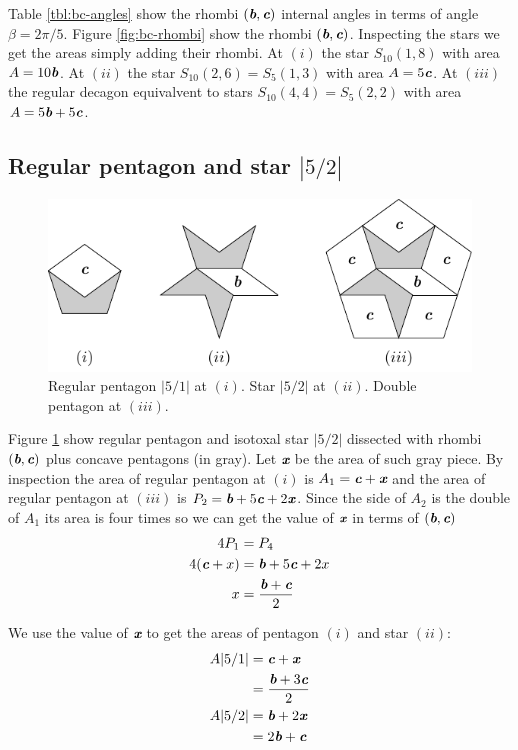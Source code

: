 \documentclass[11pt]{article}
\def\mathbi#1{\textbf{\em #1}}
\begin{document}
Table \ref {tbl:bc-angles} show the rhombi $(\mathbi{b},\mathbi{c})$ internal angles in terms of angle $\beta = 2\pi/5$.
Figure \ref{fig:bc-rhombi} show the rhombi $(\mathbi{b},\mathbi{c})$. 
Inspecting the stars we get the areas simply adding their rhombi.
At $(i)$ the star $S_{10}(1,8)$ with area $A = 10\mathbi{b}$.
At $(ii)$ the star $S_{10}(2,6) = S_5(1,3)$ with area $A = 5\mathbi{c}$.
At $(iii)$ the regular decagon equivalvent to stars $S_{10}(4,4) = S_5(2,2)$ with area $A = 5\mathbi{b} + 5\mathbi{c}$. 

\subsection{Regular pentagon and star $|5/2|$}

\begin{figure}[H]
\centering
\includegraphics[scale=1.1]{bc/penta}
\caption{Regular pentagon $|5/1|$ at $(i)$. Star $|5/2|$ at $(ii)$. Double pentagon at $(iii)$.}
\label{fig:bc-penta}
\end{figure}

Figure \ref{fig:bc-penta} show regular pentagon and isotoxal star $|5/2|$ dissected with rhombi $(\mathbi{b},\mathbi{c})$ plus concave pentagons (in gray). Let $\mathbi{x}$ be the area of such gray piece. By inspection the area of regular pentagon at $(i)$ is $A_1 = \mathbi{c} + \mathbi{x}$ and the area of regular pentagon at $(iii)$ is $P_2 = \mathbi{b} + 5\mathbi{c} + 2\mathbi{x}$. Since the side of $A_2$ is the double of $A_1$ its area is four times so we can get the value of $\mathbi{x}$ in terms of $(\mathbi{b},\mathbi{c})$
\begin{align}
4P_1 &= P_4 \nonumber\\
4(\mathbi{c} + x) &= \mathbi{b} + 5\mathbi{c} + 2x\nonumber\\
x &= \frac{\mathbi{b} + \mathbi{c}}2
\end{align}

We use the value of $\mathbi{x}$ to get the areas of pentagon $(i)$ and star $(ii)$:
\begin{align}
A|5/1| &= \mathbi{c} + \mathbi{x} \nonumber\\
 &= \frac{\mathbi{b} + 3\mathbi{c}}2 \\
A|5/2| &= \mathbi{b} + 2\mathbi{x} \nonumber\\
 &= 2\mathbi{b} + \mathbi{c}
\end{align}
\end{document}
